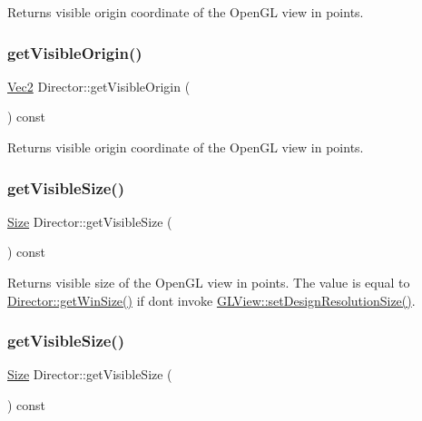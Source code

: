 Returns visible origin coordinate of the Open\+GL view in points. \mbox{\label{classDirector_a712d994af29f122e1b6496dd671718d5}} 
\subsubsection{\texorpdfstring{get\+Visible\+Origin()}{getVisibleOrigin()}\hspace{0.1cm}{\footnotesize\ttfamily [2/2]}}
{\footnotesize\ttfamily \hyperlink{classVec2}{Vec2} Director\+::get\+Visible\+Origin (\begin{DoxyParamCaption}{ }\end{DoxyParamCaption}) const}

Returns visible origin coordinate of the Open\+GL view in points. \mbox{\label{classDirector_ac17725c3dbb4876d745d897cb436b638}} 
\subsubsection{\texorpdfstring{get\+Visible\+Size()}{getVisibleSize()}\hspace{0.1cm}{\footnotesize\ttfamily [1/2]}}
{\footnotesize\ttfamily \hyperlink{classSize}{Size} Director\+::get\+Visible\+Size (\begin{DoxyParamCaption}{ }\end{DoxyParamCaption}) const}

Returns visible size of the Open\+GL view in points. The value is equal to {\ttfamily \hyperlink{classDirector_af07668df4a8916e6eb0f79a93f6588fe}{Director\+::get\+Win\+Size()}} if don\textquotesingle{}t invoke {\ttfamily \hyperlink{classGLView_a754e253a506c4eb9a923a2a33b4b955c}{G\+L\+View\+::set\+Design\+Resolution\+Size()}}. \mbox{\label{classDirector_ac17725c3dbb4876d745d897cb436b638}} 
\subsubsection{\texorpdfstring{get\+Visible\+Size()}{getVisibleSize()}\hspace{0.1cm}{\footnotesize\ttfamily [2/2]}}
{\footnotesize\ttfamily \hyperlink{classSize}{Size} Director\+::get\+Visible\+Size (\begin{DoxyParamCaption}{ }\end{DoxyParamCaption}) const}

